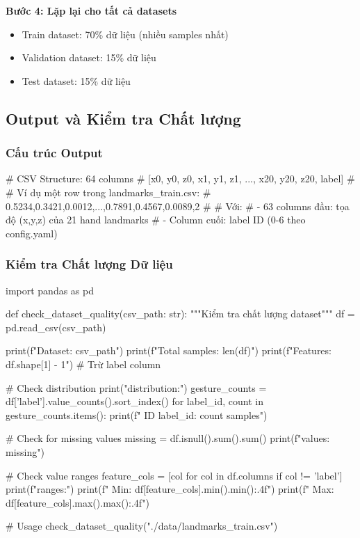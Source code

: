 \textbf{Bước 4: Lặp lại cho tất cả datasets}
\begin{itemize}
    \item Train dataset: 70\% dữ liệu (nhiều samples nhất)
    \item Validation dataset: 15\% dữ liệu  
    \item Test dataset: 15\% dữ liệu
\end{itemize}

\subsection{Output và Kiểm tra Chất lượng}

\subsubsection{Cấu trúc Output}

\begin{aivncodebox}
\begin{python}
# CSV Structure: 64 columns
# [x0, y0, z0, x1, y1, z1, ..., x20, y20, z20, label]
# 
# Ví dụ một row trong landmarks_train.csv:
# 0.5234,0.3421,0.0012,...,0.7891,0.4567,0.0089,2
#
# Với:
# - 63 columns đầu: tọa độ (x,y,z) của 21 hand landmarks
# - Column cuối: label ID (0-6 theo config.yaml)
\end{python}
\end{aivncodebox}

\subsubsection{Kiểm tra Chất lượng Dữ liệu}

\begin{aivncodebox}
\begin{python}
import pandas as pd

def check_dataset_quality(csv_path: str):
    """Kiểm tra chất lượng dataset"""
    df = pd.read_csv(csv_path)
    
    print(f"Dataset: {csv_path}")
    print(f"Total samples: {len(df)}")
    print(f"Features: {df.shape[1] - 1}")  # Trừ label column
    
    # Check distribution
    print("\nGesture distribution:")
    gesture_counts = df['label'].value_counts().sort_index()
    for label_id, count in gesture_counts.items():
        print(f"  ID {label_id}: {count} samples")
    
    # Check for missing values
    missing = df.isnull().sum().sum()
    print(f"\nMissing values: {missing}")
    
    # Check value ranges
    feature_cols = [col for col in df.columns if col != 'label']
    print(f"\nFeature ranges:")
    print(f"  Min: {df[feature_cols].min().min():.4f}")
    print(f"  Max: {df[feature_cols].max().max():.4f}")

# Usage
check_dataset_quality("./data/landmarks_train.csv")
\end{python}
\end{aivncodebox}

